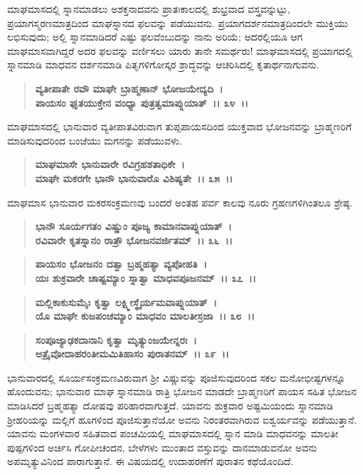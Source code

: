 ಮಾಘಮಾಸದಲ್ಲಿ ಸ್ನಾನಮಾಡಲು ಅಶಕ್ತನಾದವನು ಪ್ರಾತಃಕಾಲದಲ್ಲಿ ಶುಭ್ರವಾದ ವಸ್ತ್ರವನ್ನುಟ್ಟು, ಪ್ರಯಾಗಸ್ಮರಣಮಾತ್ರದಿಂದ ಮಾಘಸ್ನಾನದ ಫಲವನ್ನು ಪಡೆಯುವನು. ಪ್ರಯಾಗದರ್ಶನಮಾತ್ರದಿಂದಲೇ ಮುಕ್ತಿಯು ಲಭಿಸುವುದು; ಅಲ್ಲಿ ಸ್ನಾನಮಾಡಿದರೆ ಎಷ್ಟು ಫಲವೆಂಬುದನ್ನು ನಾನು ಅರಿಯೆ; ಅದರಲ್ಲಿಯೂ ಆಗ ಮಾಘಮಾಸವಾಗಿದ್ದರೆ ಅದರ ಫಲವನ್ನು ವರ್ಣಿಸಲು ಯಾರು ತಾನೇ ಸಮರ್ಥರು! ಮಾಘಮಾಸದಲ್ಲಿ ಪ್ರಯಾಗದಲ್ಲಿ ಸ್ನಾನಮಾಡಿ ಮಾಧವನ ದರ್ಶನಮಾಡಿ ಪಿತೃಗಳಿಗೋಸ್ಕರ ಶ್ರಾದ್ಧವನ್ನು ಆಚರಿಸಿದಲ್ಲಿ ಕೃತಾರ್ಥನಾಗುವನು.

\begin{verse}
\textbf{ವ್ಯತೀಪಾತೇ ರವೌ ಮಾಘೇ ಬ್ರಾಹ್ಮಣಾನ್ ಭೋಜಯೇದ್ಯದಿ~।}\\\textbf{ಪಾಯಸಂ ಘೃತಯುಕ್ತೇನ ವಂಧ್ಯಾ ಪುತ್ರತ್ವಮಾಪ್ನುಯಾತ್~।। ೩೪~।।}
\end{verse}

ಮಾಘಮಾಸದಲ್ಲಿ ಭಾನುವಾರ ವ್ಯತೀಪಾತವಿರುವಾಗ ತುಪ್ಪ\enginline{-}ಪಾಯಸದಿಂದ ಯುಕ್ತವಾದ ಭೋಜನವನ್ನು ಬ್ರಾಹ್ಮಣರಿಗೆ ಮಾಡಿಸುವುದರಿಂದ ಬಂಜೆಯು ಮಗನನ್ನು ಪಡೆಯುವಳು.

\begin{verse}
\textbf{ಮಾಘಮಾಸೇ ಭಾನುವಾರೇ ರವಿಗ್ರಹಶತಾಧಿಕೇ~।}\\\textbf{ಮಾಘೇ ಮಕರಗೇ ಭಾನೌ ಭಾನುವಾರೊ ವಿಶಿಷ್ಯತೇ~।। ೩೫~।।}
\end{verse}

ಮಾಘಮಾಸ ಭಾನುವಾರ ಮಕರಸಂಕ್ರಮಣವು ಬಂದರೆ ಅಂತಹ ಪರ್ವ ಕಾಲವು ನೂರು ಗ್ರಹಣಗಳಿಗಿಂತಲೂ ಶ್ರೇಷ್ಠ.

\begin{verse}
\textbf{ಭಾನೌ ಸೂರ್ಯಗತಂ ವಿಷ್ಣುಂ ಪೂಜ್ಯ ಕಾಮಾನವಾಪ್ನುಯಾತ್~।}\\\textbf{ರವಿವಾರೇ ಕೃತಸ್ನಾನಂ ರಾತ್ರೌ ಭೋಜನವರ್ಜಿತಮ್~।। ೩೬~।।} 
\end{verse}

\begin{verse}
\textbf{ಪಾಯಸಂ ಭೋಜನಂ ದತ್ವಾ ಬ್ರಹ್ಮಹತ್ಯಾ ವ್ಯಪೋಹತಿ~।}\\\textbf{ಯಃ ಶುಕ್ರವಾರೇ ಚಾಷ್ಟಮ್ಯಾಂ ಸ್ನಾತ್ವಾ ಮಾಧವಪೂಜನಮ್~।। ೩೭~।। }
\end{verse}

\begin{verse}
\textbf{ಮಲ್ಲಿಕಾಕುಸುಮೈಃ ಕೃತ್ವಾ ಲಕ್ಷ್ಮೀಸ್ಥೈರ್ಯಮವಾಪ್ನುಯಾತ್~।}\\\textbf{ಯೊ ಮಾಘೇ ಕುಜಪಂಚಮ್ಯಾಂ ಮಾಧವಂ ಮಾಲತೀಸ್ರಜಾ~।। ೩೮~।।} 
\end{verse}

\begin{verse}
\textbf{ಸಂಪೂಜ್ಯಾಢಕದಾನಾನಿ ಕೃತ್ವಾ ಮೃತ್ಯುಂಜಯೇನ್ನರಃ~।}\\\textbf{ಅತ್ರೈವೋದಾಹರಂತೀಮಮಿತಿಹಾಸಂ ಪುರಾತನಮ್~।। ೩೯~।।}
\end{verse}

ಭಾನುವಾರದಲ್ಲಿ ಸೂರ್ಯಸಂಕ್ರಮಣವಿರುವಾಗ ಶ‍್ರೀ ವಿಷ್ಣುವನ್ನು ಪೂಜಿಸುವುದರಿಂದ ಸಕಲ ಮನೋಭೀಷ್ಟಗಳನ್ನೂ ಹೊಂದುವನು; ಭಾನುವಾರ ಮಾಘ ಸ್ನಾನಮಾಡಿ ರಾತ್ರಿ ಭೋಜನ ಮಾಡದೇ ಬ್ರಾಹ್ಮಣರಿಗೆ ಪಾಯಸ ಸಹಿತ ಭೋಜನ ಮಾಡಿಸಿದರೆ ಬ್ರಹ್ಮಹತ್ಯಾ ದೋಷವು ಪರಿಹಾರವಾಗುತ್ತದೆ. ಯಾವನು ಶುಕ್ರವಾರ ಅಷ್ಟಮಿಯಂದು ಸ್ನಾನಮಾಡಿ ಶ‍್ರೀಹರಿಯನ್ನು ಮಲ್ಲಿಗೆ ಹೂಗಳಿಂದ ಪೂಜಿಸುತ್ತಾನೆಯೋ ಅವನು ನಿರಂತರವಾಗಿರುವ ಐಶ್ವರ್ಯವನ್ನು ಪಡೆಯುತ್ತಾನೆ. ಯಾವನು ಮಂಗಳವಾರ ಸಹಿತವಾದ ಪಂಚಮಿಯಲ್ಲಿ ಮಾಘಮಾಸದಲ್ಲಿ ಸ್ನಾನ ಮಾಡಿ ಮಾಧವನನ್ನು ಮಾಲತೀ ಪುಷ್ಪಗಳಿಂದ ಅರ್ಚಿಸಿ ಗೋಪೀಚಂದನ, ಬೇಳೆಗಳು ಮುಂತಾದ ವಸ್ತುವನ್ನು ದಾನಮಾಡುವನೋ ಅವನು ಅಪಮೃತ್ಯುವಿನಿಂದ ಪಾರಾಗುತ್ತಾನೆ. ಈ ವಿಷಯದಲ್ಲಿ ಉದಾಹರಣೆಗೆ ಪುರಾತನ ಕಥೆಯೊಂದಿದೆ.

